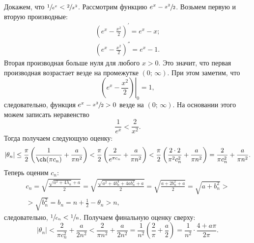 \documentclass[12pt, a4paper]{article}
\begin{document}
Докажем, что $\sfrac{1}{e^x}<\sfrac{2}{x^2}$. Рассмотрим функцию $e^x - \sfrac{x^2}{2}$. Возьмем первую и вторую производные:
\begin{gather*}
\left(e^x-\frac{x^2}{2}\right)^{'} = e^x - x; \\
\left(e^x - \frac{x^2}{2}\right)^{''}=e^x-1.
\end{gather*}
Вторая производная больше нуля для любого $x>0$. Это значит, что первая произ\-вод\-ная возрастает везде на промежутке $(0;\,\infty)$. При этом заметим, что 
\[
\left.\left( e^x - \frac{x^2}{2}\right) \right|_0 = 1,
\]
следовательно, функция $e^x - \sfrac{x^2}{2}>0$ везде на $(0;\,\infty)$. На основании этого можем записать неравенство
\[
\frac{1}{e^x}<\frac{2}{x^2}.
\]
Тогда получаем следующую оценку:
\[
|\theta_n|\le \frac{\pi}{2}\left(\frac{1}{\ch(\pi c_n)} + \frac{a}{\pi n^2}\right) < \frac{\pi}{2}\left(\frac{2}{e^{\pi c_n}} + \frac{a}{\pi n^2}\right) <
\frac{\pi}{2}\left(\frac{2\cdot 2}{\pi^2 c_n^2} + \frac{a}{\pi n^2}\right) = \frac{2}{\pi c_n^2} + \frac{a}{\pi n^2}.
\]
Теперь оценим $c_n$:
\begin{multline*}
c_n = \sqrt{\frac{\sqrt{a^2+4\lambda_n}+a}{2}} = \sqrt{\frac{\sqrt{a^2+4 b_n^4+4a b_n^2}+a}{2}} = \sqrt{\frac{a+2b_n^2+a}{2}} = \sqrt{a+b_n^2} > \\ > \sqrt{b_n^2} = b_n = n + \frac12 - \theta_n > n,
\end{multline*}
следовательно, $\sfrac{1}{c_n}<\sfrac{1}{n}$.
Получаем финальную оценку сверху:
\begin{equation}
|\theta_n|< \frac{2}{\pi c_n^2} + \frac{a}{2 n^2} < \frac{2}{\pi n^2} + \frac{a}{2n^2} = \frac{1}{n^2}(\frac{2}{\pi} + \frac{a}{2}) = \frac{1}{n^2}\cdot\frac{4+a\pi}{2\pi}. \label{up}
\end{equation}
\end{document}
